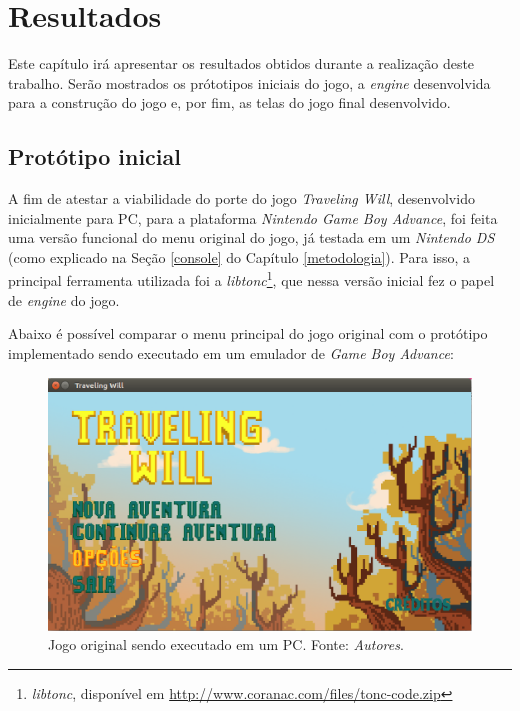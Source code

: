 \chapter[Resultados]{Resultados}

Este capítulo irá apresentar os resultados obtidos durante a realização deste trabalho. Serão mostrados os prótotipos iniciais do jogo, a \textit{engine} desenvolvida para a construção do jogo e, por fim, as telas do jogo final desenvolvido.

\section{Protótipo inicial}

A fim de atestar a viabilidade do porte do jogo \textit{Traveling Will}, desenvolvido inicialmente para PC, para a plataforma \textit{Nintendo Game Boy Advance}, foi feita uma versão funcional do menu original do jogo, já testada em um \textit{Nintendo DS} (como explicado na Seção \ref{console} do Capítulo \ref{metodologia}). Para isso, a principal ferramenta utilizada foi a \textit{libtonc}\footnote{\textit{libtonc}, disponível em \url{http://www.coranac.com/files/tonc-code.zip}}, que nessa versão inicial fez o papel de \textit{engine} do jogo.

Abaixo é possível comparar o menu principal do jogo original com o protótipo implementado sendo executado em um emulador de \textit{Game Boy Advance}:

\begin{figure}[H]
 \centering \includegraphics[keepaspectratio=true,scale=0.6]{figuras/tw-original-1.eps}
   \caption[Jogo original sendo executado em um PC]
    {Jogo original sendo executado em um PC. Fonte: \textit{Autores}.}
   \label{tw-original-1}
\end{figure}

